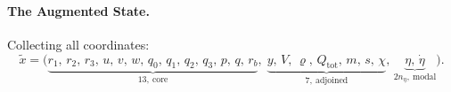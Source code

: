 \paragraph{The Augmented State.}
Collecting all coordinates:
\begin{equation}
\label{eq:augmented_state}
\tilde{x} = \bigl(
\underbrace{r_1,\,r_2,\,r_3,\,u,\,v,\,w,\,q_0,\,q_1,\,q_2,\,q_3,\,p,\,q,\,r_b}_{13,\ \text{core}},\;
\underbrace{y,\,V,\,\varrho,\,Q_{\mathrm{tot}},\,m,\,s,\,\chi}_{7,\ \text{adjoined}},\,
\underbrace{\eta,\,\dot\eta}_{2n_\eta,\ \text{modal}}\bigr).
\end{equation}
